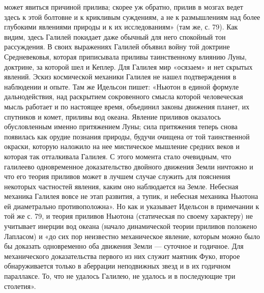 может явиться причиной прилива; скорее уж обратно, прилив в мозгах ведет здесь
к этой болтовне и к крикливым суждениям, а не к размышлениям над более
глубокими явлениями природы и к их исследованиям» (там же, с. 79). Как видим,
здесь Галилей покидает даже обычный для него спокойный тон рассуждения. В своих
выражениях Галилей объявил войну той доктрине Средневековья, которая
приписывала приливы таинственному влиянию Луны, доктрине, за которой
шел и Кеплер. Для Галилея мир «осязаем» и нет скрытых явлений. Эскиз
космической механики Галилея не нашел подтверждения в наблюдении и опыте. Там
же Идельсон пишет: «Ньютон в единой формуле дальнодействия, над раскрытием
сокровенного смысла которой человеческая мысль работает и по настоящее время,
объединил законы движения планет, их спутников и комет, приливы вод океана.
Явление приливов оказалось обусловленным именно притяжением Луны; сила
притяжения теперь снова появилась как орудие познания природы, будучи очищена
от той таинственной окраски, которую наложило на нее мистическое мышление
средних веков и которая так отталкивала Галилея. С этого момента стало
очевидным, что галилеево одновременное доказательство двойного движения Земли
ничтожно и что его теория приливов может в лучшем случае служить для пояснения
некоторых частностей явления, каким оно наблюдается на Земле. Небесная механика
Галилея вовсе не этап развития, а тупик, и небесная механика Ньютона ей
диаметрально противоположна». Но как и указывает Идельсон в примечании к той же
с. 79, и теория приливов Ньютона (статическая по своему характеру) не учитывает
инерции вод океана (начало динамической теории приливов положено Лапласом) и
«до сих пор неизвестно механическое явление, которым можно было бы доказать
одновременно оба движения Земли --- суточное и годичное. Для механического
доказательства первого из них служит маятник Фуко, второе обнаруживается только
в аберрации неподвижных звезд и в их годичном параллаксе. То, что не удалось
Галилею, не удалось и в последующие три столетия».

